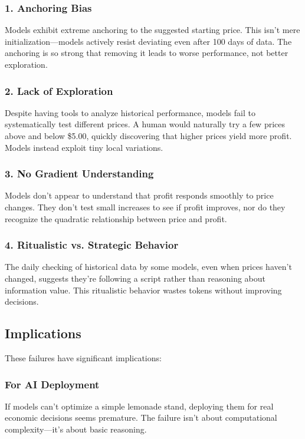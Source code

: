 \documentclass[11pt]{article}
\begin{document}
\subsubsection{1. Anchoring Bias}
Models exhibit extreme anchoring to the suggested starting price. This isn't mere initialization—models actively resist deviating even after 100 days of data. The anchoring is so strong that removing it leads to worse performance, not better exploration.

\subsubsection{2. Lack of Exploration}
Despite having tools to analyze historical performance, models fail to systematically test different prices. A human would naturally try a few prices above and below \$5.00, quickly discovering that higher prices yield more profit. Models instead exploit tiny local variations.

\subsubsection{3. No Gradient Understanding}
Models don't appear to understand that profit responds smoothly to price changes. They don't test small increases to see if profit improves, nor do they recognize the quadratic relationship between price and profit.

\subsubsection{4. Ritualistic vs. Strategic Behavior}
The daily checking of historical data by some models, even when prices haven't changed, suggests they're following a script rather than reasoning about information value. This ritualistic behavior wastes tokens without improving decisions.

\subsection{Implications}

These failures have significant implications:

\subsubsection{For AI Deployment}
If models can't optimize a simple lemonade stand, deploying them for real economic decisions seems premature. The failure isn't about computational complexity—it's about basic reasoning.
\end{document}
